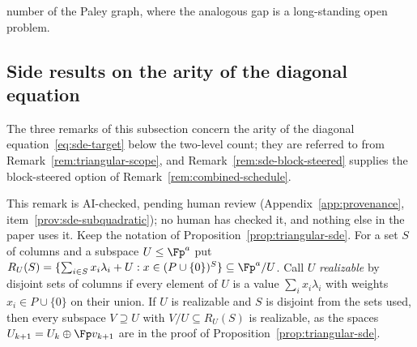 \begin{remark}
number of the Paley graph, where the analogous gap is a long-standing open problem.
\end{remark}

\subsection{Side results on the arity of the diagonal equation}
\label{app:sde-side-arity}

The three remarks of this subsection concern the arity of the diagonal equation~\eqref{eq:sde-target} below the two-level count; they are referred to from Remark~\ref{rem:triangular-scope}, and Remark~\ref{rem:sde-block-steered} supplies the block-steered option of Remark~\ref{rem:combined-schedule}.

\begin{remark}
\label{rem:sde-subquadratic}
This remark is AI-checked, pending human review (Appendix~\ref{app:provenance}, item~\ref{prov:sde-subquadratic}); no human has checked it, and nothing else in the paper uses it. Keep the notation of Proposition~\ref{prop:triangular-sde}. For a set $S$ of columns and a subspace $U\le\Fp^{a}$ put $R_U(S)=\{\sum_{i\in S}x_i\lambda_i+U : x\in(P\cup\{0\})^{S}\}\subseteq\Fp^a/U$. Call $U$ \emph{realizable} by disjoint sets of columns if every element of $U$ is a value $\sum_i x_i\lambda_i$ with weights $x_i\in P\cup\{0\}$ on their union. If $U$ is realizable and $S$ is disjoint from the sets used, then every subspace $V\supseteq U$ with $V/U\subseteq R_U(S)$ is realizable, as the spaces $U_{k+1}=U_k\oplus\Fp v_{k+1}$ are in the proof of Proposition~\ref{prop:triangular-sde}.


\end{remark}
